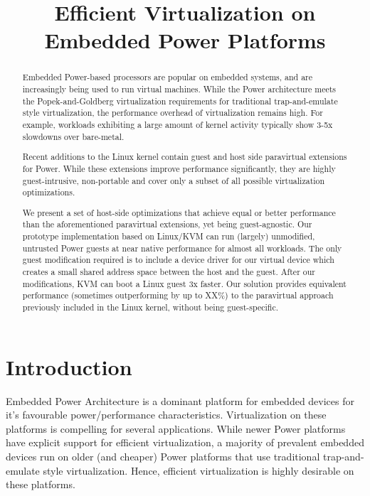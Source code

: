 \documentclass[10pt,twocolumn]{article}
\begin{document}
\title{Efficient Virtualization on Embedded Power Platforms}
\author{}
\date{}
\maketitle
\thispagestyle{empty}

\maketitle
\begin{abstract}
  Embedded Power-based processors are popular on embedded systems, and are increasingly
  being used to run virtual machines\cite{XXX}. While the Power architecture meets the
  Popek-and-Goldberg virtualization requirements for traditional trap-and-emulate
  style virtualization, the performance overhead of virtualization remains high.
  For example, workloads exhibiting a large amount of kernel activity typically
  show 3-5x slowdowns over bare-metal.

  Recent additions to the Linux kernel contain guest and host side paravirtual
  extensions for Power. While these extensions improve performance significantly, they
  are highly guest-intrusive, non-portable and cover only a subset of all possible
  virtualization optimizations.

  We present a set of host-side optimizations that achieve equal or better performance
  than the aforementioned paravirtual extensions, yet being guest-agnostic. Our
  prototype implementation based on Linux/KVM can run (largely) unmodified, untrusted
  Power guests at near native performance for almost all workloads. The only
  guest modification required is to include a device driver for our virtual
  device which creates a small shared address space between the host and the guest.
  After our modifications, KVM can boot a Linux guest 3x faster. Our solution
  provides equivalent performance (sometimes outperforming by up to XX\%) to
  the paravirtual approach previously included in the Linux kernel, without being
  guest-specific.
\end{abstract}
\section{Introduction}
Embedded Power Architecture is a dominant platform for embedded devices for it's
favourable power/performance characteristics. Virtualization on these platforms is
compelling for several applications\cite{XXX}. While newer Power platforms
have explicit support for efficient virtualization\cite{XXX}, a majority of
prevalent embedded devices run on older (and cheaper) Power platforms that use
traditional trap-and-emulate style virtualization\cite{XXX}. Hence, efficient
virtualization is highly desirable on these platforms.
\end{document}

